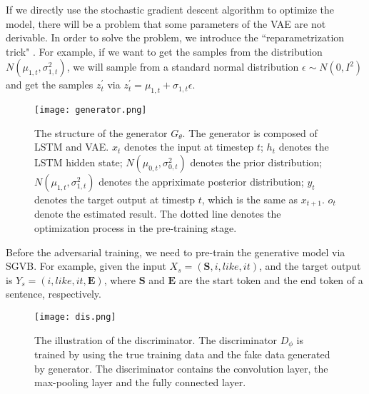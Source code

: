 \documentclass{llncs}
\begin{document}
	If we directly use the stochastic gradient descent algorithm to optimize the model, there will be a problem that some parameters of the VAE are not derivable. In order to solve the problem, we introduce the ``reparametrization trick" \cite{kingma2014auto-encoding}. For example, if we want to get the samples from the distribution $N(\mu _{1,t},\sigma ^{2} _{1,t})$, we will sample from a standard normal distribution $\epsilon \sim N(0,I^{2}) $  and get the samples $z_{t}^{\prime}$  via $z_{t}^{\prime} =\mu_{1,t} + \sigma_{1,t} \epsilon$.
\begin{figure}[!t]
\centering
\centerline{\texttt{[image: generator.png]}}
\caption{The structure of the generator $G_{\theta}$. The generator is composed of LSTM and VAE. $x_{t}$ denotes the input at timestep $t$; $h_{t}$ denotes the LSTM hidden state; $N(\mu_{0,t},\sigma_{0,t}^{2})$ denotes the prior distribution;  $N(\mu_{1,t},\sigma_{1,t}^{2})$ denotes the appriximate posterior distribution; $y_{t}$ denotes the target output at timestp $t$, which is the same as $x_{t+1}$.  $o_{t}$ denote the estimated result. The dotted line denotes the optimization process in the pre-training stage.}
\label{fig:fig1}
\end{figure}
Before the adversarial training, we need to pre-train the generative model via SGVB. For example, given the input $ X_{s} =( \textbf{S}, i, like, it )$, and the target output is $ Y_{s} =( i, like, it, \textbf{E} )$, where $\textbf{S}$ and $\textbf{E}$ are the start token and the end token of  a sentence, respectively. 
\begin{figure}[!t]
\centering
\centerline{\texttt{[image: dis.png]}}
\caption{The illustration of the discriminator. The discriminator $D_{\phi}$ is trained by using the true training data and the fake data generated by generator. The discriminator contains the convolution layer, the max-pooling layer and the fully connected layer. }
\label{fig:fig2}
\end{figure}
\end{document}
